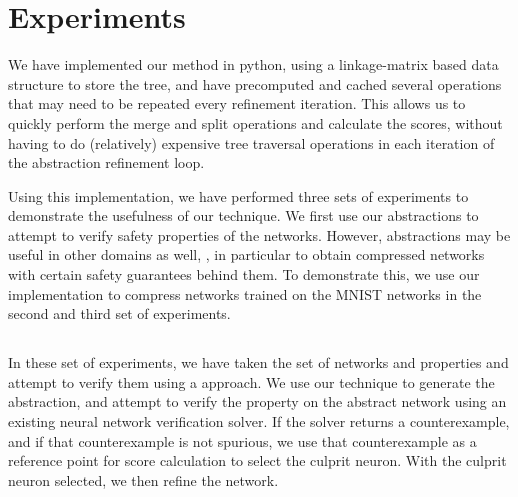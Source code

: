 \section{Experiments}

We have implemented our method in python, using a linkage-matrix based
data structure to store the tree, and have precomputed and cached several
operations that may need to be repeated every refinement iteration. This allows
us to quickly perform the merge and split operations and calculate the
scores,  without having to do (relatively)
expensive tree traversal operations in each iteration of the abstraction
refinement loop. 

Using this implementation, we have performed three sets of experiments to
demonstrate the usefulness of our technique. We first use our abstractions to
attempt to verify safety properties of the \acasxu networks. However,
abstractions may be useful in other
domains as well, , in particular to obtain compressed networks with certain safety guarantees behind them. To
demonstrate this, we use our implementation to compress networks trained on the
MNIST networks in the second and third set of experiments. 


\subsection{\acasxu}

In these set of experiments, we have taken the \acasxu set of
networks  and
properties and attempt to verify them using a \cegar approach. We use our
technique to generate the abstraction, and attempt to verify the property on the
abstract network using an existing neural network verification solver. If the
solver returns a counterexample, and if that counterexample is not spurious, we
use that counterexample as a reference point for score calculation  to select the culprit neuron.  With the culprit
neuron selected, we then refine the network.

